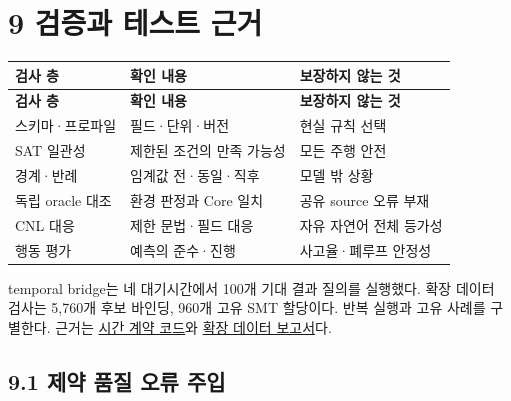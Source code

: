 \documentclass[11pt,a4paper]{article}
\begin{document}
\clearpage{}\section*{9 검증과 테스트 근거}

\begingroup\small
\begin{longtable}{@{}>{\raggedright\arraybackslash}p{}>{\raggedright\arraybackslash}p{}>{\raggedright\arraybackslash}p{}@{}}
\toprule
\textbf{검사 층} & \textbf{확인 내용} & \textbf{보장하지 않는 것} \\
\midrule\endfirsthead
\toprule
\textbf{검사 층} & \textbf{확인 내용} & \textbf{보장하지 않는 것} \\
\midrule\endhead
\bottomrule\endfoot
스키마·프로파일 & 필드·단위·버전 & 현실 규칙 선택 \\
SAT 일관성 & 제한된 조건의 만족 가능성 & 모든 주행 안전 \\
경계·반례 & 임계값 전·동일·직후 & 모델 밖 상황 \\
독립 oracle 대조 & 환경 판정과 Core 일치 & 공유 source 오류 부재 \\
CNL 대응 & 제한 문법·필드 대응 & 자유 자연어 전체 등가성 \\
행동 평가 & 예측의 준수·진행 & 사고율·폐루프 안정성 \\
\end{longtable}
\endgroup

temporal bridge는 네 대기시간에서 100개 기대 결과 질의를 실행했다. 확장 데이터 검사는 5,760개 후보 바인딩, 960개 고유 SMT 할당이다. 반복 실행과 고유 사례를 구별한다. 근거는 \href{\detokenize{../../../../../../projects/04-guardsynth-coc/experiments/paper1_cnl_learning/temporal_preservation.py}}{시간 계약 코드}와 \href{\detokenize{../temporal-training-data-2026-09-29-001/REPORT_KO.md}}{확장 데이터 보고서}다.\par

\subsection*{9.1 제약 품질 오류 주입}
\end{document}
